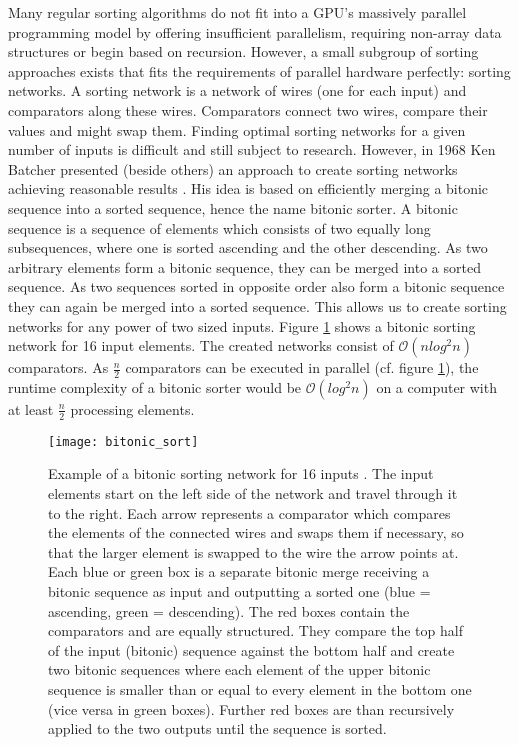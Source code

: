 Many regular sorting algorithms do not fit into a GPU's massively parallel programming model by offering insufficient parallelism, requiring non-array data structures or begin based on recursion. However, a small subgroup of sorting approaches exists that fits the requirements of parallel hardware perfectly: sorting networks. A sorting network is a network of wires (one for each input) and comparators along these wires. Comparators connect two wires, compare their values and might swap them.
Finding optimal sorting networks for a given number of inputs is difficult and still subject to research. However, in 1968 Ken Batcher presented (beside others) an approach to create sorting networks achieving reasonable results \cite{sort_bitonic}. His idea is based on efficiently merging a bitonic sequence into a sorted sequence, hence the name bitonic sorter. A bitonic sequence is a sequence of elements which consists of two equally long subsequences, where one is sorted ascending and the other descending. As two arbitrary elements form a bitonic sequence, they can be merged into a sorted sequence. As two sequences sorted in opposite order also form a bitonic sequence they can again be merged into a sorted sequence. This allows us to create sorting networks for any power of two sized inputs. Figure \ref{fig:bitonic_sort} shows a bitonic sorting network for 16 input elements. The created networks consist of $\mathcal{O}(n  log^2 n)$ comparators. As $\frac{n}{2}$ comparators can be executed in parallel (cf. figure \ref{fig:bitonic_sort}), the runtime complexity of a bitonic sorter would be $\mathcal{O}(log^2 n)$ on a computer with at least $\frac{n}{2}$ processing elements.

\begin{figure}
\centering
\texttt{[image: bitonic\_sort]}
\caption{Example of a bitonic sorting network for 16 inputs \cite{wiki_bitonic_sort}. The input elements start on the left side of the network and travel through it to the right. Each arrow represents a comparator which compares the elements of the connected wires and swaps them if necessary, so that the larger element is swapped to the wire the arrow points at. Each blue or green box is a separate bitonic merge receiving a bitonic sequence as input and outputting a sorted one (blue = ascending, green = descending). The red boxes contain the comparators and are equally structured. They compare the top half of the input (bitonic) sequence against the bottom half and create two bitonic sequences where each element of the upper bitonic sequence is smaller than or equal to every element in the bottom one (vice versa in green boxes). Further red boxes are than recursively applied to the two outputs until the sequence is sorted.}
\label{fig:bitonic_sort}
\end{figure}

